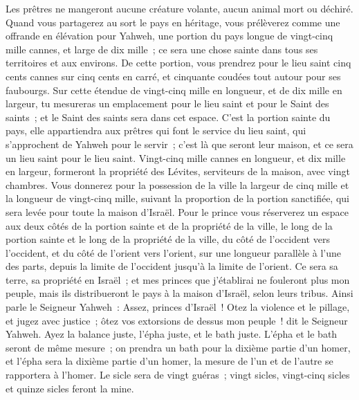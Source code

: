 \begin{multicols}{2}
Les prêtres ne mangeront aucune créature volante, aucun animal mort ou déchiré.
\VerseOne{}Quand vous partagerez au sort le pays en héritage, vous prélèverez comme une offrande en élévation pour Yahweh, une portion du pays longue de vingt-cinq mille cannes, et large de dix mille~; ce sera une chose sainte dans tous ses territoires et aux environs.
De cette portion, vous prendrez pour le lieu saint cinq cents cannes sur cinq cents en carré, et cinquante coudées tout autour pour ses faubourgs.
Sur cette étendue de vingt-cinq mille en longueur, et de dix mille en largeur, tu mesureras un emplacement pour le lieu saint et pour le Saint des saints~; et le Saint des saints sera dans cet espace.
C'est la portion sainte du pays, elle appartiendra aux prêtres qui font le service du lieu saint, qui s'approchent de Yahweh pour le servir~; c'est là que seront leur maison, et ce sera un lieu saint pour le lieu saint.
Vingt-cinq mille cannes en longueur, et dix mille en largeur, formeront la propriété des Lévites, serviteurs de la maison, avec vingt chambres.
Vous donnerez pour la possession de la ville la largeur de cinq mille et la longueur de vingt-cinq mille, suivant la proportion de la portion sanctifiée, qui sera levée pour toute la maison d'Israël.
Pour le prince vous réserverez un espace aux deux côtés de la portion sainte et de la propriété de la ville, le long de la portion sainte et le long de la propriété de la ville, du côté de l'occident vers l'occident, et du côté de l'orient vers l'orient, sur une longueur parallèle à l'une des parts, depuis la limite de l'occident jusqu'à la limite de l'orient.
Ce sera sa terre, sa propriété en Israël~; et mes princes que j'établirai ne fouleront plus mon peuple, mais ils distribueront le pays à la maison d'Israël, selon leurs tribus.
Ainsi parle le Seigneur Yahweh~: Assez, princes d'Israël~! Otez la violence et le pillage, et jugez avec justice~; ôtez vos extorsions de dessus mon peuple~! dit le Seigneur Yahweh.
Ayez la balance juste, l'épha juste, et le bath juste.
L'épha et le bath seront de même mesure~; on prendra un bath pour la dixième partie d'un homer, et l'épha sera la dixième partie d'un homer, la mesure de l'un et de l'autre se rapportera à l'homer.
Le sicle sera de vingt guéras~; vingt sicles, vingt-cinq sicles et quinze sicles feront la mine.

\end{multicols}
